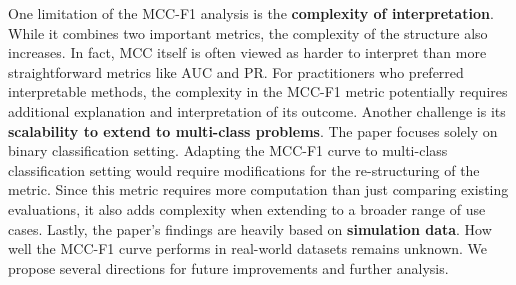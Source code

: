 \documentclass[12pt, oneside]{amsart}
\theoremstyle{definition}
\theoremstyle{remark}
\numberwithin{equation}{section}
\begin{document}
One limitation of the MCC-F1 analysis is the \textbf{complexity of interpretation}. While it combines two important metrics, the complexity of the structure also increases. In fact, MCC itself is often viewed as harder to interpret than more straightforward metrics like AUC and PR. For practitioners who preferred interpretable methods, the complexity in the MCC-F1 metric potentially requires additional explanation and interpretation of its outcome. Another challenge is its \textbf{scalability to extend to multi-class problems}. The paper focuses solely on binary classification setting. Adapting the MCC-F1 curve to multi-class classification setting would require modifications for the re-structuring of the metric. Since this metric requires more computation than just comparing existing evaluations, it also adds complexity when extending to a broader range of use cases. Lastly, the paper's findings are heavily based on \textbf{simulation data}. How well the MCC-F1 curve performs in real-world datasets remains unknown. We propose several directions for future improvements and further analysis.
\end{document}
